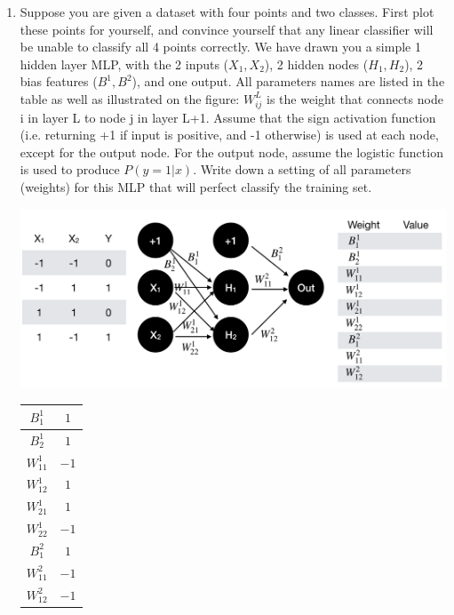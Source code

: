 \documentclass[10pt]{report}
\begin{document}
\begin{enumerate}
\item Suppose you are given a dataset with four points and two classes. First plot these points for yourself, and convince yourself that any linear classifier will be unable to classify all 4 points correctly. We have drawn you a simple 1 hidden layer MLP, with the 2 inputs ($X_1, X_2$), 2 hidden nodes ($H_1, H_2$), 2 bias features ($B^1, B^2$), and one output. All parameters names are listed in the table as well as illustrated on the figure: $W^L_{ij}$ is the weight that connects node i in layer L to node j in layer L+1. Assume that the sign activation function (i.e. returning +1 if input is positive, and -1 otherwise) is used at each node, except for the output node. For the output node, assume the logistic function is used to produce $P(y=1|x)$. Write down a setting of all parameters (weights) for this MLP that will perfect classify the training set.

\begin{center}
\includegraphics[width=6in]{nn.png}
\end{center}
\begin{solution}
\begin{center}
    \begin{tabular}{|c|c|}
    \hline
        $B^1_1$ & $1$ \\
    \hline
        $B^1_2$ & $1$ \\
    \hline
        $W^1_{11}$ & $-1$ \\
    \hline
        $W^1_{12}$ & $1$ \\
    \hline
        $W^1_{21}$ & $1$ \\
    \hline
        $W^1_{22}$ & $-1$ \\
    \hline
        $B^2_1$ & $1$ \\
    \hline
        $W^2_{11}$ & $-1$ \\
    \hline
        $W^2_{12}$ & $-1$ \\
    \hline
        
    \end{tabular}
\end{center}
\end{solution}


\end{enumerate}
\end{document}
